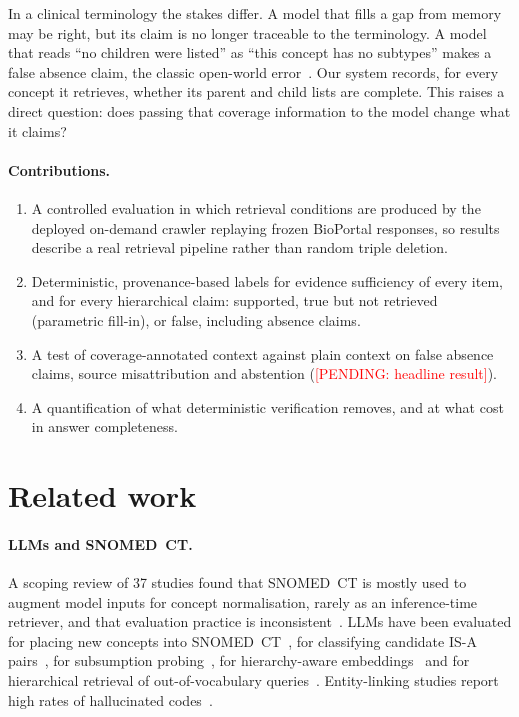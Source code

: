 \documentclass[11pt]{article}
\newcommand{\pending}[1]{\textcolor{red}{[PENDING: #1]}}
\newcommand{\sct}{SNOMED~CT}
\begin{document}
In a clinical terminology the stakes differ. A model that fills a gap from memory may be right, but its claim is no longer traceable to the terminology. A model that reads ``no children were listed'' as ``this concept has no subtypes'' makes a false absence claim, the classic open-world error~\citep{razniewski2024completeness}. Our system records, for every concept it retrieves, whether its parent and child lists are complete. This raises a direct question: does passing that coverage information to the model change what it claims?

\paragraph{Contributions.}
\begin{enumerate}
  \item A controlled evaluation in which retrieval conditions are produced by the deployed on-demand crawler replaying frozen BioPortal responses, so results describe a real retrieval pipeline rather than random triple deletion.
  \item Deterministic, provenance-based labels for evidence sufficiency of every item, and for every hierarchical claim: supported, true but not retrieved (parametric fill-in), or false, including absence claims.
  \item A test of coverage-annotated context against plain context on false absence claims, source misattribution and abstention (\pending{headline result}).
  \item A quantification of what deterministic verification removes, and at what cost in answer completeness.
\end{enumerate}

\section{Related work}

\paragraph{LLMs and \sct{}.} A scoping review of 37 studies found that \sct{} is mostly used to augment model inputs for concept normalisation, rarely as an inference-time retriever, and that evaluation practice is inconsistent~\citep{chang2024snomedllm}. LLMs have been evaluated for placing new concepts into \sct{}~\citep{dong2024placement}, for classifying candidate IS-A pairs~\citep{liu2024ichi}, for subsumption probing~\citep{he2023ontolama}, for hierarchy-aware embeddings~\citep{he2024hit} and for hierarchical retrieval of out-of-vocabulary queries~\citep{dilworth2025hierarchical}. Entity-linking studies report high rates of hallucinated codes~\citep{born2026hallucinations,schmid2025gmds,davidson2025elchallenge,mavridis2025rdf}.
\end{document}
